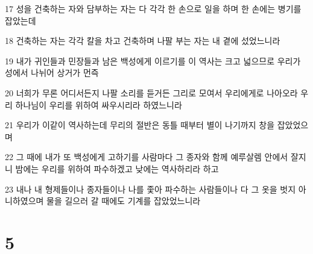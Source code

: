 \par 17 성을 건축하는 자와 담부하는 자는 다 각각 한 손으로 일을 하며 한 손에는 병기를 잡았는데
\par 18 건축하는 자는 각각 칼을 차고 건축하며 나팔 부는 자는 내 곁에 섰었느니라
\par 19 내가 귀인들과 민장들과 남은 백성에게 이르기를 이 역사는 크고 넓으므로 우리가 성에서 나뉘어 상거가 먼즉
\par 20 너희가 무론 어디서든지 나팔 소리를 듣거든 그리로 모여서 우리에게로 나아오라 우리 하나님이 우리를 위하여 싸우시리라 하였느니라
\par 21 우리가 이같이 역사하는데 무리의 절반은 동틀 때부터 별이 나기까지 창을 잡았었으며
\par 22 그 때에 내가 또 백성에게 고하기를 사람마다 그 종자와 함께 예루살렘 안에서 잘지니 밤에는 우리를 위하여 파수하겠고 낮에는 역사하리라 하고
\par 23 내나 내 형제들이나 종자들이나 나를 좇아 파수하는 사람들이나 다 그 옷을 벗지 아니하였으며 물을 길으러 갈 때에도 기계를 잡았었느니라

\chapter{5}

